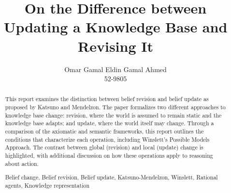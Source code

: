 \documentclass[runningheads]{llncs}
\newcommand{\keywords}[1]{\par\addvspace\baselineskip
\noindent\keywordname\enspace\ignorespaces#1}
\begin{document}
\mainmatter  %

\title{On the Difference between Updating a Knowledge Base and Revising It}


%
%
\author{Omar Gamal Eldin Gamal Ahmed\\ 
52-9805}
%


%
%

\maketitle


\begin{abstract}
This report examines the distinction between belief revision and belief update as proposed by Katsuno and Mendelzon. The paper formalizes two different approaches to knowledge base change: revision, where the world is assumed to remain static and the knowledge base adapts; and update, where the world itself may change. Through a comparison of the axiomatic and semantic frameworks, this report outlines the conditions that characterize each operation, including Winslett’s Possible Models Approach. The contrast between global (revision) and local (update) change is highlighted, with additional discussion on how these operations apply to reasoning about action.
\keywords{Belief change, Belief revision, Belief update, Katsuno-Mendelzon, Winslett, Rational agents, Knowledge representation}
\end{abstract}
\end{document}
